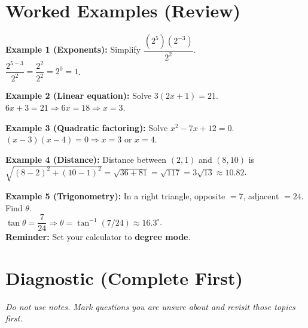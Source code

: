 \documentclass[12pt,oneside]{article}
\newcommand{\degmode}{\textbf{Reminder:} Set your calculator to \textbf{degree mode}.}
\begin{document}
\section{Worked Examples (Review)}

\textbf{Example 1 (Exponents):} Simplify $\dfrac{(2^5)(2^{-3})}{2^2}$.\\
$\dfrac{2^{5-3}}{2^2}=\dfrac{2^2}{2^2}=2^0=1$.

\textbf{Example 2 (Linear equation):} Solve $3(2x+1)=21$.\\
$6x+3=21\Rightarrow 6x=18\Rightarrow x=3$.

\textbf{Example 3 (Quadratic factoring):} Solve $x^2-7x+12=0$.\\
$(x-3)(x-4)=0\Rightarrow x=3$ or $x=4$.

\textbf{Example 4 (Distance):} Distance between $(2,1)$ and $(8,10)$ is\\
$\sqrt{(8-2)^2+(10-1)^2}=\sqrt{36+81}=\sqrt{117}=3\sqrt{13}\approx10.82$.

\textbf{Example 5 (Trigonometry):} In a right triangle, opposite $=7$, adjacent $=24$. Find $\theta$.\\
$\tan\theta=\dfrac{7}{24}\Rightarrow \theta=\tan^{-1}(7/24)\approx 16.3^\circ$.\\
\degmode

\section{Diagnostic (Complete First)}
\textit{Do not use notes. Mark questions you are unsure about and revisit those topics first.}
\end{document}

